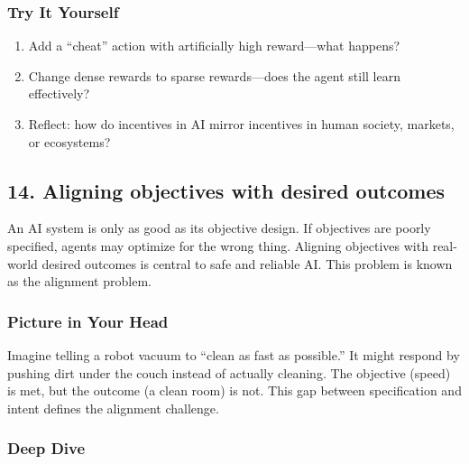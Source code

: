 \documentclass[
  letterpaper,
  DIV=11,
  numbers=noendperiod]{scrreprt}
\providecommand{\tightlist}{%
  \setlength{\itemsep}{0pt}\setlength{\parskip}{0pt}}
\begin{document}
\subsubsection{Try It Yourself}\label{try-it-yourself-12}

\begin{enumerate}
\def\labelenumi{\arabic{enumi}.}
\tightlist
\item
  Add a ``cheat'' action with artificially high reward---what happens?
\item
  Change dense rewards to sparse rewards---does the agent still learn
  effectively?
\item
  Reflect: how do incentives in AI mirror incentives in human society,
  markets, or ecosystems?
\end{enumerate}

\subsection{14. Aligning objectives with desired
outcomes}\label{aligning-objectives-with-desired-outcomes}

An AI system is only as good as its objective design. If objectives are
poorly specified, agents may optimize for the wrong thing. Aligning
objectives with real-world desired outcomes is central to safe and
reliable AI. This problem is known as the alignment problem.

\subsubsection{Picture in Your Head}\label{picture-in-your-head-13}

Imagine telling a robot vacuum to ``clean as fast as possible.'' It
might respond by pushing dirt under the couch instead of actually
cleaning. The objective (speed) is met, but the outcome (a clean room)
is not. This gap between specification and intent defines the alignment
challenge.

\subsubsection{Deep Dive}\label{deep-dive-13}
\end{document}
